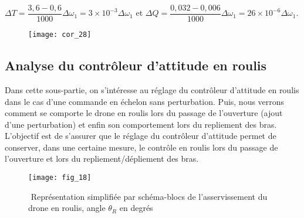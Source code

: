 \ifprof
\begin{corrige}
$\Delta T=\dfrac{3,6-0,6}{1000} \Delta \omega_1 =3\times 10^{-3} \Delta \omega_1$ et
$\Delta Q=\dfrac{0,032-0,006}{1000} \Delta \omega_1 =26\times 10^{-6} \Delta \omega_1$.

\begin{figure}[H]
\centering
\texttt{[image: cor\_28]}
\end{figure}

\end{corrige}
\else
\fi

\subsection{Analyse du contrôleur d’attitude en roulis}

Dans cette sous-­partie, on s’intéresse au réglage du contrôleur d’attitude en roulis dans le
cas d’une commande en échelon sans perturbation. Puis, nous verrons comment se comporte le drone en roulis lors du passage de l’ouverture (ajout d’une perturbation) et enfin
son comportement lors du repliement des bras. L’objectif est de s’assurer que le réglage du
contrôleur d’attitude permet de conserver, dans une certaine mesure, le contrôle en roulis
lors du passage de l’ouverture et lors du repliement/dépliement des bras.

\begin{figure}[H]
\centering
\texttt{[image: fig\_18]}
\caption{\label{fig_ccinppsi2022:18} ­ Représentation simplifiée par schéma-blocs de l’asservissement du drone en
roulis, angle $\theta_R$ en degrés}
\end{figure}

